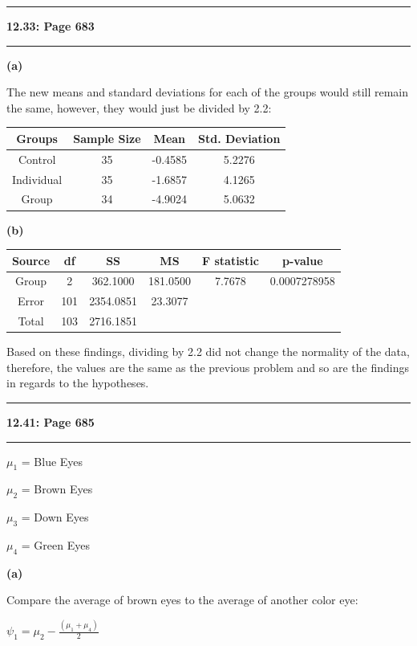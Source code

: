 \documentclass[11pt]{article}
\newcommand\question[2]{\vspace{.25in}\hrule\textbf{#1: #2}\vspace{.5em}\hrule\vspace{.10in}}
\renewcommand\part[1]{\vspace{.10in}\textbf{(#1)}\par}
\begin{document}
\question{12.33}{Page 683}
	\part{a}
		The new means and standard deviations for each of the groups would still remain the same, however, they would just be divided by 2.2:\par
		\begin{tabular}{|c|c|c|c|}
			\hline
			Groups & Sample Size & Mean & Std. Deviation\\
			\hline
			Control & 35 & -0.4585 & 5.2276\\
			\hline
			Individual & 35 & -1.6857 & 4.1265\\
			\hline
			Group & 34 & -4.9024 & 5.0632\\
			\hline
		\end{tabular}\par
	
	\part{b}
		\begin{tabular}{|c|c|c|c|c|c|}
			\hline
			Source & df & SS & MS & F statistic & p-value\\
			\hline
			Group & 2 & 362.1000 & 181.0500 & 7.7678 & 0.0007278958\\
			\hline
			Error & 101 & 2354.0851 & 23.3077 & &\\
			\hline
			Total & 103 & 2716.1851 &&&\\
			\hline
		\end{tabular}\par
		Based on these findings, dividing by 2.2 did not change the normality of the data, therefore, the values are the same as the previous problem and so are the findings in regards to the hypotheses. \par


\question{12.41}{Page 685}
		$\mu_{1}$ = Blue Eyes\par
		$\mu_{2}$ = Brown Eyes\par
		$\mu_{3}$ = Down Eyes\par
		$\mu_{4}$ = Green Eyes\par
	\part{a}
		Compare the average of brown eyes to the average of another color eye:\par
		$\psi_{1}=\mu_{2} - \frac{(\mu_{1} + \mu_{4})}{2}$\par
	
\end{document}
